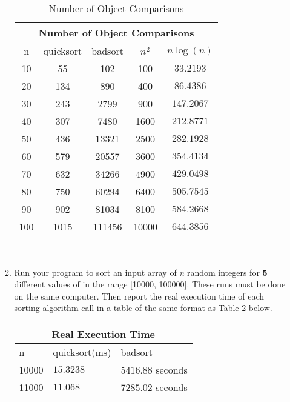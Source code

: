 \begin{enumerate}
\begin{enumerate}
\begin{table}
  \begin{center}
    \begin{tabular}{| c | c | c | c | c|}\hline
    \multicolumn{5}{|c|}{Number of Object Comparisons} \\ \hline
    n & quicksort & badsort & $n^{2}$ & $n\log{(n)}$ \\ \hline
  10  & 55        & 102     & 100     &  $33.2193$   \\ \hline
  20  & 134       & 890     & 400     &  $86.4386$   \\ \hline
  30  & 243       & 2799    & 900     & $147.2067$   \\ \hline
  40  & 307       & 7480    & 1600    & $212.8771$   \\ \hline
  50  & 436       & 13321   & 2500    & $282.1928$   \\ \hline
  60  & 579       & 20557   & 3600    & $354.4134$   \\ \hline
  70  & 632       & 34266   & 4900    & $429.0498$   \\ \hline
  80  & 750       & 60294   & 6400    & $505.7545$   \\ \hline
  90  & 902       & 81034   & 8100    & $584.2668$   \\ \hline
  100 & 1015      & 111456  & 10000   & $644.3856$   \\ \hline
    \end{tabular}\\
  \caption{Number of Object Comparisons}
  \label{tab:numberofobjectcomparisons}
  \end{center}
\end{table}
  \item Run your program to sort an input array of \emph{n} random integers for \textbf{5} different values of in the range [10000, 100000]. These runs must be done on the same computer. Then report the real execution time of each sorting algorithm call in a table of the same format as Table 2 below.
\begin{table}
  \begin{center}
    \begin{tabular}{|l | l | l|}\hline
    \multicolumn{3}{|c|}{Real Execution Time} \\ \hline
    n    & quicksort(ms) & badsort   \\ \hline
  10000  & $15.3238$     & $5416.88$ seconds \\ \hline
  11000  & $11.068$      & $7285.02$ seconds \\ \hline

\end{tabular}
\end{center}
\end{table}
\end{enumerate}
\end{enumerate}
